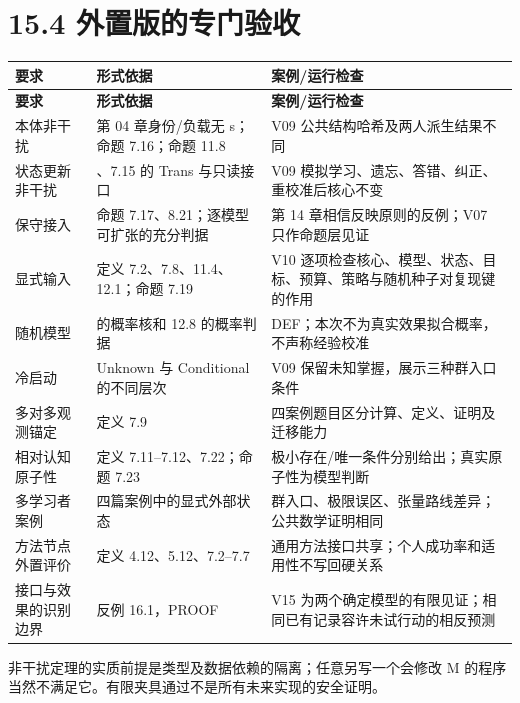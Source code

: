 \documentclass[UTF8,a4paper,zihao=-4,fontset=windows,openany]{ctexbook}
\begin{document}
\section{15.4 外置版的专门验收}
\begingroup\small\setlength{\tabcolsep}{4pt}
\begin{longtable}{>{\raggedright\arraybackslash}p{}>{\raggedright\arraybackslash}p{}>{\raggedright\arraybackslash}p{}}
\toprule
\textbf{要求} & \textbf{形式依据} & \textbf{案例/运行检查} \\
\midrule
\endfirsthead
\toprule
\textbf{要求} & \textbf{形式依据} & \textbf{案例/运行检查} \\
\midrule
\endhead
\bottomrule
\endfoot
\bottomrule
\endlastfoot
本体非干扰 & 第 04 章身份/负载无 s；命题 7.16；命题 11.8 & V09 公共结构哈希及两人派生结果不同 \\
状态更新非干扰 & 7.8、7.15 的 Trans 与只读接口 & V09 模拟学习、遗忘、答错、纠正、重校准后核心不变 \\
保守接入 & 命题 7.17、8.21；逐模型可扩张的充分判据 & 第 14 章相信反映原则的反例；V07 只作命题层见证 \\
显式输入 & 定义 7.2、7.8、11.4、12.1；命题 7.19 & V10 逐项检查核心、模型、状态、目标、预算、策略与随机种子对复现键的作用 \\
随机模型 & 7.8 的概率核和 12.8 的概率判据 & DEF；本次不为真实效果拟合概率，不声称经验校准 \\
冷启动 & Unknown 与 Conditional 的不同层次 & V09 保留未知掌握，展示三种群入口条件 \\
多对多观测锚定 & 定义 7.9 & 四案例题目区分计算、定义、证明及迁移能力 \\
相对认知原子性 & 定义 7.11–7.12、7.22；命题 7.23 & 极小存在/唯一条件分别给出；真实原子性为模型判断 \\
多学习者案例 & 四篇案例中的显式外部状态 & 群入口、极限误区、张量路线差异；公共数学证明相同 \\
方法节点外置评价 & 定义 4.12、5.12、7.2–7.7 & 通用方法接口共享；个人成功率和适用性不写回硬关系 \\
接口与效果的识别边界 & 反例 16.1，PROOF & V15 为两个确定模型的有限见证；相同已有记录容许未试行动的相反预测 \\
\end{longtable}
\endgroup

非干扰定理的实质前提是类型及数据依赖的隔离；任意另写一个会修改 M 的程序当然不满足它。有限夹具通过不是所有未来实现的安全证明。
\end{document}
